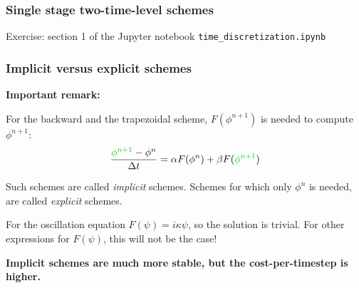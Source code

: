 \documentclass[aspectratio=149,9pt]{beamer}
\begin{document}
%
%
%
\begin{frame}
	\frametitle{Single stage two-time-level schemes}
	Exercise: section 1 of the Jupyter notebook \texttt{time\_discretization.ipynb}
\end{frame}
%
%
\begin{frame}
	\frametitle{Implicit versus explicit schemes}
	\textbf{Important remark:}
	\par\vspace*{3ex}
	For the backward and the trapezoidal scheme, $F(\phi^{n+1})$ is needed to compute $\phi^{n+1}$:
	\begin{equation*}
		\frac{\textcolor{green!80!black}{\phi^{n+1}}-\phi^n}{\Delta t}=\alpha F(\phi^n)+\beta F(\textcolor{green!80!black}{\phi^{n+1}})
	\end{equation*}
	\par\vspace*{2ex}
	Such schemes are called \emph{implicit} schemes. Schemes for which only $\phi^n$ is needed, are called \emph{explicit} schemes.
	\par\vspace*{4ex}
	For the oscillation equation $F(\psi)=i\kappa\psi$, so the solution is trivial. For other expressions for $F(\psi)$, this will not be the case!
\pause
	\par\vspace*{4ex}
	\textbf{Implicit schemes are much more stable, but the cost-per-timestep is higher.}
\end{frame}
%
%
\end{document}
